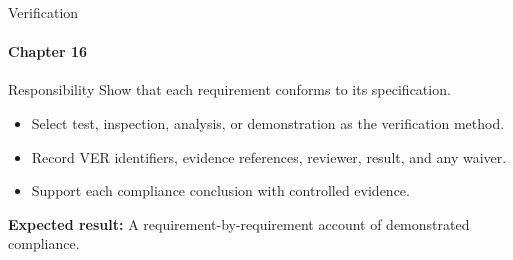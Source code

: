 \begin{frame}{Verification}
\framesubtitle{Chapter 16}
\begin{block}{Responsibility}
Show that each requirement conforms to its specification.
\end{block}
\begin{itemize}
  \item Select test, inspection, analysis, or demonstration as the verification method.
  \item Record VER identifiers, evidence references, reviewer, result, and any waiver.
  \item Support each compliance conclusion with controlled evidence.
\end{itemize}
\vspace{0.15cm}
\textbf{Expected result:} A requirement-by-requirement account of demonstrated compliance.
\end{frame}
